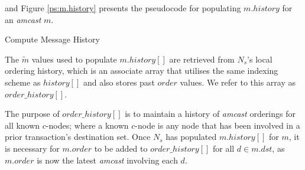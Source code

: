 \begin{enumerate}
        and Figure \ref{ps:m.history} presents the pseudocode for populating $m.history$ for an \emph{amcast} $m$.  
        
               \begin{algorithm}
       \caption{Compute Message History}
        \label{ps:m.history}
        \begin{algorithmic}
                \ELSE
                \ENDIF
            \ENDFOR
        \end{algorithmic}
    \end{algorithm}       
         
        The $\tilde{m}$ values used to populate $m.history[]$ are retrieved from $N_s$'s local ordering history, which is an associate array that utilises the same indexing scheme as $history[]$ and also stores past $order$ values.  We refer to this array as $order\_history[]$.  
        
        The purpose of $order\_history[]$ is to maintain a history of \emph{amcast} orderings for all known $c$-nodes; where a known $c$-node is any node that has been involved in a prior transaction's destination set.  Once $N_s$ has populated $m.history[]$ for $m$, it is necessary for $m.order$ to be added to $order\_history[]$ for all $d \in m.dst$, as $m.order$ is now the latest \emph{amcast} involving each $d$.  
    
        
        
		

\end{enumerate}
